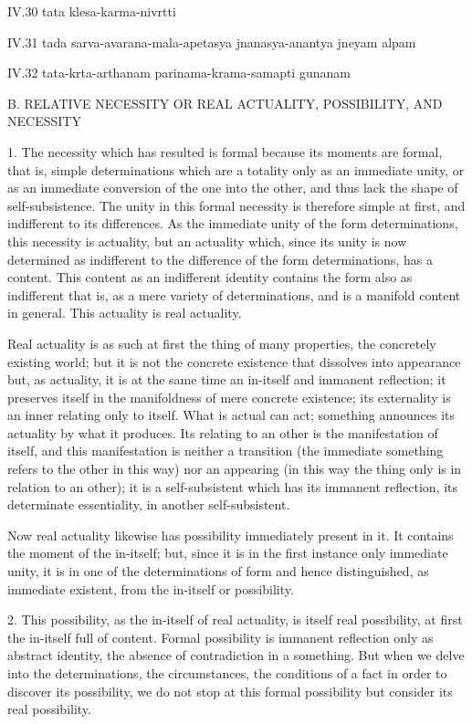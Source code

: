 IV.30
tata klesa-karma-nivrtti

IV.31
tada sarva-avarana-mala-apetasya jnanasya-anantya jneyam alpam

IV.32
tata-krta-arthanam parinama-krama-samapti gunanam

B. RELATIVE NECESSITY OR REAL ACTUALITY, POSSIBILITY, AND NECESSITY

1. The necessity which has resulted is formal
because its moments are formal,
that is, simple determinations which are a totality
only as an immediate unity,
or as an immediate conversion of the one into the other,
and thus lack the shape of self-subsistence.
The unity in this formal necessity is therefore simple at first,
and indifferent to its differences.
As the immediate unity of the form determinations,
this necessity is actuality,
but an actuality which, since its unity is now determined as indifferent
to the difference of the form determinations, has a content.
This content as an indifferent identity contains the form
also as indifferent that is, as a mere variety of determinations,
and is a manifold content in general.
This actuality is real actuality.

Real actuality is as such at first
the thing of many properties,
the concretely existing world;
but it is not the concrete existence
that dissolves into appearance
but, as actuality, it is at the same time
an in-itself and immanent reflection;
it preserves itself in the manifoldness of mere concrete existence;
its externality is an inner relating only to itself.
What is actual can act;
something announces its actuality by what it produces.
Its relating to an other is the manifestation of itself,
and this manifestation is
neither a transition
(the immediate something refers to the other in this way)
nor an appearing
(in this way the thing only is in relation to an other);
it is a self-subsistent which has its immanent reflection,
its determinate essentiality, in another self-subsistent.

Now real actuality likewise has possibility immediately present in it.
It contains the moment of the in-itself;
but, since it is in the first instance only immediate unity,
it is in one of the determinations of form
and hence distinguished, as immediate existent,
from the in-itself or possibility.

2. This possibility, as the in-itself of real actuality,
is itself real possibility, at first the in-itself full of content.
Formal possibility is immanent reflection only as abstract identity,
the absence of contradiction in a something.
But when we delve into the determinations,
the circumstances, the conditions of a fact
in order to discover its possibility,
we do not stop at this formal possibility
but consider its real possibility.

